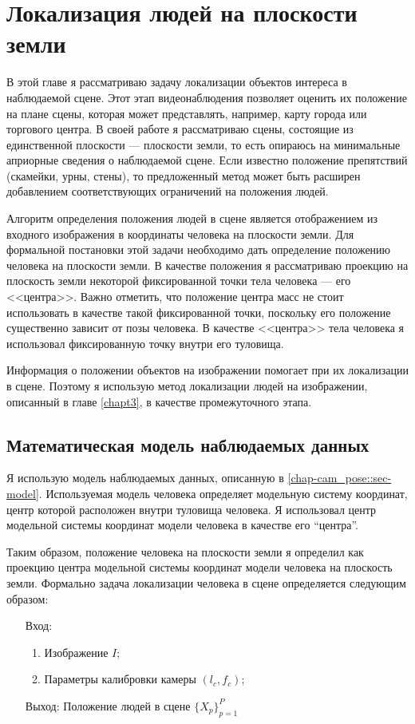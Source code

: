 \iffalse
\chapter{Локализация людей на плоскости земли} \label{chapt4}

В этой главе я рассматриваю задачу локализации объектов интереса в наблюдаемой сцене. Этот этап видеонаблюдения позволяет оценить их положение на плане сцены, которая может представлять, например, карту города или торгового центра. В своей работе я рассматриваю сцены, состоящие из единственной плоскости --- плоскости земли, то есть опираюсь на минимальные априорные сведения о наблюдаемой сцене. Если известно положение препятствий (скамейки, урны, стены), то предложенный метод может быть расширен добавлением соответствующих ограничений на положения людей.

Алгоритм определения положения людей в сцене является отображением из входного изображения в координаты человека на плоскости земли. Для формальной постановки этой задачи необходимо дать определение положению человека на плоскости земли. В качестве положения я рассматриваю проекцию на плоскость земли некоторой фиксированной точки тела человека --- его <<центра>>. Важно отметить, что положение центра масс не стоит использовать в качестве такой фиксированной точки, поскольку его положение существенно зависит от позы человека. В качестве <<центра>> тела человека я использовал фиксированную точку внутри его туловища.

Информация о положении объектов на изображении помогает при их локализации в сцене. Поэтому я использую метод локализации людей на изображении, описанный в главе \ref{chapt3}, в качестве промежуточного этапа.

\section{Математическая модель наблюдаемых данных} \label{chapt-per_pose::sec-model}

Я использую модель наблюдаемых данных, описанную в \ref{chap-cam_pose::sec-model}. Используемая модель человека \cite{pishchulin15arxiv} определяет модельную систему координат, центр которой расположен внутри туловища человека. Я использовал центр модельной системы координат модели человека в качестве его ``центра''.

Таким образом, положение человека на плоскости земли я определил как проекцию центра модельной системы координат модели человека на плоскость земли. Формально задача локализации человека в сцене определяется следующим образом:
\begin{itemize}
	\item[Вход:] 
	\begin{enumerate}
		\item Изображение $I$;
		\item Параметры калибровки камеры $(l_c, f_c)$;
	\end{enumerate}
	\item[Выход:] Положение людей в сцене $\{X_p\}_{p=1}^P$
\end{itemize}

